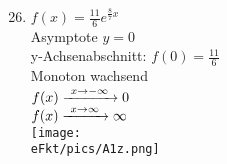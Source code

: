 \begin{Answer}[ref=eFktA1]
\begin{minipage}{\textwidth}
\begin{minipage}[t]{0.49\textwidth}
\begin{enumerate}[label=\alph*)]
			\end{enumerate}
		\end{minipage}
		\begin{minipage}[t]{0.49\textwidth}
			\begin{enumerate}[label=\alph*)]
				\setcounter{enumi}{25}
				\item \(f(x)=\frac{11}{6}e^{\frac{8}{7}x}\)\\
				Asymptote \(y=0\)\\
				y-Achsenabschnitt: \(f(0)=\frac{11}{6}\)\\
				Monoton wachsend\\
				\(f(x)\xrightarrow{\hphantom{\ }x\to-\infty\hphantom{\ }}0\)\\
				\(f(x)\xrightarrow{\hphantom{\ }x\to\infty\hphantom{\ }}\infty\)\\
				\texttt{[image: \\eFkt/pics/A1z.png]}
			\end{enumerate}
		\end{minipage}
	\end{minipage}\\
\end{Answer}